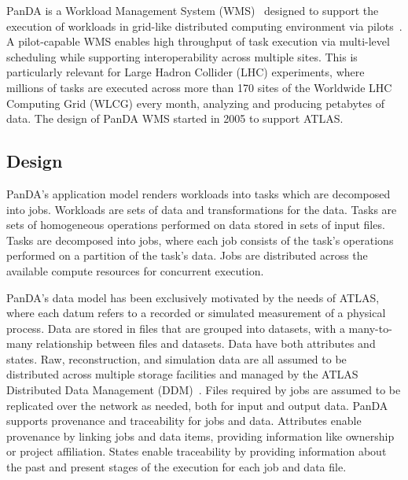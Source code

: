 PanDA is a Workload Management System (WMS)~\cite{marco2009glite} designed to
support the execution of workloads in grid-like distributed computing
environment via pilots~\cite{turilli2017comprehensive}. A pilot-capable WMS
enables high throughput of task execution via multi-level scheduling while
supporting interoperability across multiple sites. This is particularly
relevant for Large Hadron Collider (LHC) experiments, where millions of tasks
are executed across more than 170 sites of the Worldwide LHC Computing Grid
(WLCG) every month, analyzing and producing petabytes of data. The design of
PanDA WMS started in 2005 to support ATLAS.

\subsection{Design}
\label{subsec:design}

PanDA's application model renders workloads into tasks which are decomposed
into jobs. Workloads are sets of data and transformations for the data. Tasks
are sets of homogeneous operations performed on data stored in sets of input
files. Tasks are decomposed into jobs, where each job consists of the task's
operations performed on a partition of the task's data. Jobs are distributed
across the available compute resources for concurrent execution.

PanDA's data model has been exclusively motivated by the needs of ATLAS, where
each datum refers to a recorded or simulated measurement of a physical process.
Data are stored in files that are grouped into datasets, with a many-to-many
relationship between files and datasets. Data have both attributes and states.
Raw, reconstruction, and simulation data are all assumed to be distributed
across multiple storage facilities and managed by the ATLAS Distributed Data
Management (DDM)~\cite{garonne2012atlas}. Files required by jobs are assumed to
be replicated over the network as needed, both for input and output data. PanDA
supports provenance and traceability for jobs and data. Attributes enable
provenance by linking jobs and data items, providing information like ownership
or project affiliation. States enable traceability by providing information
about the past and present stages of the execution for each job and data file.


